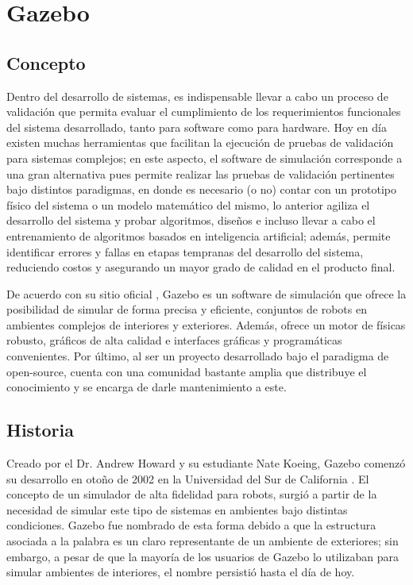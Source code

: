 \section{Gazebo}

\subsection{Concepto}
Dentro del desarrollo de sistemas, es indispensable llevar a cabo un proceso de validación que permita evaluar el cumplimiento de los requerimientos funcionales del sistema desarrollado, tanto para software como para hardware. Hoy en día existen muchas herramientas que facilitan la ejecución de pruebas de validación para sistemas complejos; en este aspecto, el software de simulación corresponde a una gran alternativa pues permite realizar las pruebas de validación pertinentes bajo distintos paradigmas, en donde es necesario (o no) contar con un prototipo físico del sistema o un modelo matemático del mismo, lo anterior agiliza el desarrollo del sistema y probar algoritmos, diseños e incluso llevar a cabo el entrenamiento de algoritmos basados en inteligencia artificial; además, permite identificar errores y fallas en etapas tempranas del desarrollo del sistema, reduciendo costos y asegurando un mayor grado de calidad en el producto final.

De acuerdo con su sitio oficial \cite{gazebo_2014}, Gazebo es un software de simulación que ofrece la posibilidad de simular de forma precisa y eficiente, conjuntos de robots en ambientes complejos de interiores y exteriores. Además, ofrece un motor de físicas robusto, gráficos de alta calidad e interfaces gráficas y programáticas convenientes. Por último, al ser un proyecto desarrollado bajo el paradigma de open-source, cuenta con una comunidad bastante amplia que distribuye el conocimiento y se encarga de darle mantenimiento a este.

\subsection{Historia}
Creado por el Dr. Andrew Howard y su estudiante Nate Koeing, Gazebo comenzó su desarrollo en otoño de 2002 en la Universidad del Sur de California \cite{gazebo_2014}. El concepto de un simulador de alta fidelidad para robots, surgió a partir de la necesidad de simular este tipo de sistemas en ambientes bajo distintas condiciones. Gazebo fue nombrado de esta forma debido a que la estructura asociada a la palabra es un claro representante de un ambiente de exteriores; sin embargo, a pesar de que la mayoría de los usuarios de Gazebo lo utilizaban para simular ambientes de interiores, el nombre persistió hasta el día de hoy.

